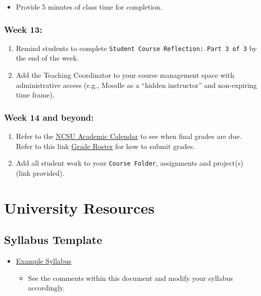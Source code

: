 \documentclass[
]{book}
\providecommand{\tightlist}{%
  \setlength{\itemsep}{0pt}\setlength{\parskip}{0pt}}
\begin{document}
\begin{itemize}
\tightlist
\item
  Provide 5 minutes of class time for completion.
\end{itemize}

\hypertarget{week-13}{%
\subsection{Week 13:}\label{week-13}}

\begin{enumerate}
\def\labelenumi{\arabic{enumi})}
\item
  Remind students to complete \texttt{Student\ Course\ Reflection:\ Part\ 3\ of\ 3} by the end of the week.
\item
  Add the Teaching Coordinator to your course management space with administrative access (e.g., Moodle as a ``hidden instructor'' and non-expiring time frame).
\end{enumerate}

\hypertarget{week-14-and-beyond}{%
\subsection{Week 14 and beyond:}\label{week-14-and-beyond}}

\begin{enumerate}
\def\labelenumi{\arabic{enumi})}
\item
  Refer to the \href{https://studentservices.ncsu.edu/calendars/academic/}{NCSU Academic Calendar} to see when final grades are due. Refer to this link \href{https://sis.emas.ncsu.edu/faculty/faculty-center/\#grades}{Grade Roster} for how to submit grades.
\item
  Add all student work to your \texttt{Course\ Folder}, assignments and project(s) (link provided).
\end{enumerate}

\hypertarget{university-resources}{%
\chapter{University Resources}\label{university-resources}}

\hypertarget{syllabus-template}{%
\section{Syllabus Template}\label{syllabus-template}}

\begin{itemize}
\tightlist
\item
  \href{https://docs.google.com/document/d/12w-byO3kEmP4ofI8GIuDAbXkEOA3hwqVGXz3qRbX-l4/edit?usp=sharing}{Example Syllabus}

  \begin{itemize}
  \tightlist
  \item
    See the comments within this document and modify your syllabus accordingly.
  \end{itemize}
\end{itemize}
\end{document}
